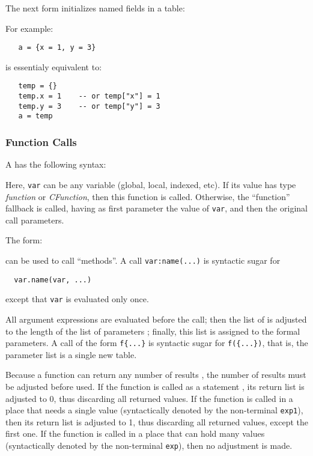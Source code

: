 The next form initializes named fields in a table:
\begin{Produc}
\end{Produc}%
For example:
\begin{verbatim}
   a = {x = 1, y = 3}
\end{verbatim}
is essentialy equivalent to:
\begin{verbatim}
   temp = {}
   temp.x = 1    -- or temp["x"] = 1
   temp.y = 3    -- or temp["y"] = 3
   a = temp
\end{verbatim}


\subsubsection{Function Calls}  \label{functioncall}
A  has the following syntax:
\begin{Produc}
\end{Produc}%
Here, \verb'var' can be any variable (global, local, indexed, etc).
If its value has type {\em function\/} or {\em CFunction},
then this function is called.
Otherwise, the ``function'' fallback is called,
having as first parameter the value of \verb'var',
and then the original call parameters.

The form:
\begin{Produc}
\end{Produc}%
can be used to call ``methods''.
A call \verb'var:name(...)'
is syntactic sugar for
\begin{verbatim}
  var.name(var, ...)
\end{verbatim}
except that \verb'var' is evaluated only once.

\begin{Produc}
\end{Produc}%
All argument expressions are evaluated before the call;
then the list of  is adjusted to
the length of the list of parameters ;
finally, this list is assigned to the formal parameters.
A call of the form \verb'f{...}' is syntactic sugar for
\verb'f({...})', that is,
the parameter list is a single new table.

Because a function can return any number of results
,
the number of results must be adjusted before used.
If the function is called as a statement ,
its return list is adjusted to 0,
thus discarding all returned values.
If the function is called in a place that needs a single value
(syntactically denoted by the non-terminal \verb'exp1'),
then its return list is adjusted to 1,
thus discarding all returned values,
except the first one.
If the function is called in a place that can hold many values
(syntactically denoted by the non-terminal \verb'exp'),
then no adjustment is made.


